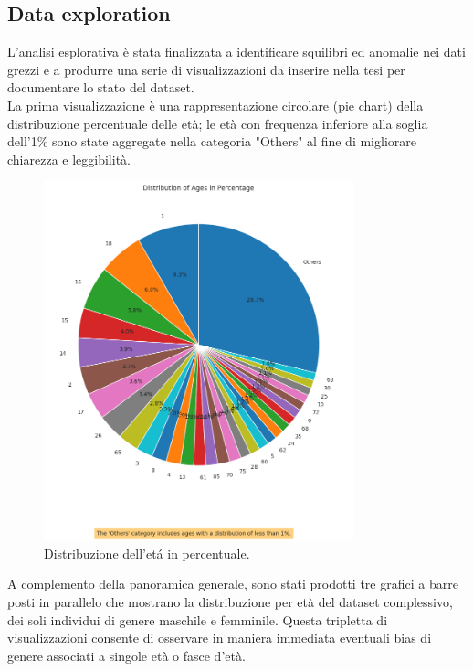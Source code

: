 \documentclass[a4paper,12pt]{report}
\begin{document}
	\subsection{Data exploration}	
	L'analisi esplorativa è stata finalizzata a identificare squilibri ed anomalie nei dati grezzi e a produrre una serie di visualizzazioni da inserire nella tesi per documentare lo stato del dataset. \\
	La prima visualizzazione è una rappresentazione circolare (pie chart) della distribuzione percentuale delle età; le età con frequenza inferiore alla soglia dell'1\% sono state aggregate nella categoria "Others" al fine di migliorare chiarezza e leggibilità. \\
	
	\begin{figure}[H]
		\centering
		\includegraphics[width=0.8\textwidth]{img/ages_image.png}
		\caption{Distribuzione dell'etá in percentuale.}
	\end{figure}
	
	A complemento della panoramica generale, sono stati prodotti tre grafici a barre posti in parallelo che mostrano la distribuzione per età del dataset complessivo, dei soli individui di genere maschile e femminile. Questa tripletta di visualizzazioni consente di osservare in maniera immediata eventuali bias di genere associati a singole età o fasce d'età. \\
	
\end{document}
